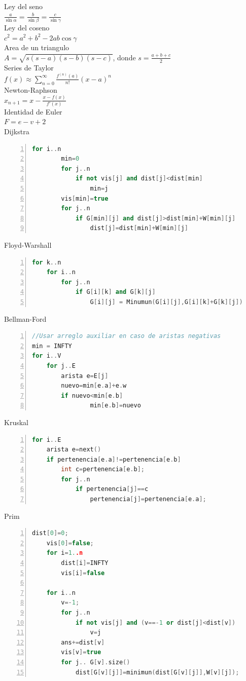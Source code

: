 \documentclass[a4paper,spanish,10pt]{article}
\begin{document}
\newpage
Ley del seno\\
$\frac{a}{\sin \alpha } = \frac{b}{\sin \beta} = \frac{c}{\sin \gamma} $\\
Ley del coseno\\
$c^2 = a^2+b^2-2ab\cos{\gamma}$\\
Area de un triangulo \\
$A = \sqrt{s(s-a)(s-b)(s-c)}$, donde $s = \frac{a+b+c}{2}$\\
Series de Taylor\\
$f(x) \approx \sum_{n=0}^\infty\frac{f^{(n)}(a)}{n!}(x-a)^n$ \\
Newton-Raphson\\
$x_{n+1} = x-\frac{x-f(x)}{f\prime(x)}$\\
Identidad de Euler\\
$F = e - v+ 2$\\
Dijkstra\\
\begin{lstlisting}[language=C++, numbers=left,tabsize=4]
for i..n
		min=0
		for j..n
			if not vis[j] and dist[j]<dist[min]
				min=j
		vis[min]=true
		for j..n
			if G[min][j] and dist[j]>dist[min]+W[min][j]
				dist[j]=dist[min]+W[min][j]
\end{lstlisting}
Floyd-Warshall\\
\begin{lstlisting}[language=C++,numbers=left,tabsize=4]
for k..n
    for i..n
        for j..n
        	if G[i][k] and G[k][j] 
        		G[i][j] = Minumun(G[i][j],G[i][k]+G[k][j])
\end{lstlisting}
Bellman-Ford\\
\begin{lstlisting}[language=C++,numbers=left,tabsize=4]
//Usar arreglo auxiliar en caso de aristas negativas
min = INFTY
for i..V
	for j..E
		arista e=E[j]
		nuevo=min[e.a]+e.w
		if nuevo<min[e.b]
				min[e.b]=nuevo		
\end{lstlisting}


Kruskal\\
\begin{lstlisting}[language=C++,numbers=left,tabsize=4]
for i..E
	arista e=next()
	if pertenencia[e.a]!=pertenencia[e.b]
		int c=pertenencia[e.b];
		for j..n
			if pertenencia[j]==c
				pertenencia[j]=pertenencia[e.a];

\end{lstlisting}
\newpage
Prim\\
\begin{lstlisting}[numbers=left,language=C++,tabsize=4]
	dist[0]=0;
	vis[0]=false;
	for i=1..n
		dist[i]=INFTY
		vis[i]=false

	for i..n
		v=-1;
		for j..n
			if not vis[j] and (v==-1 or dist[j]<dist[v])
				v=j
		ans+=dist[v]
		vis[v]=true
		for j.. G[v].size()
			dist[G[v][j]]=minimun(dist[G[v][j]],W[v][j]);
\end{lstlisting}
\end{document}
